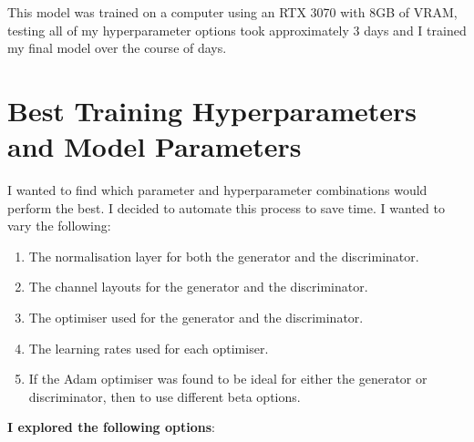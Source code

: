 \documentclass{UoYCSproject}
\begin{document}


This model was trained on a computer using an RTX 3070 with 8GB of VRAM, testing all of my hyperparameter options took approximately 3 days and I trained my final model over the course of 
days.

\section{Best Training Hyperparameters and Model Parameters}

I wanted to find which parameter and hyperparameter combinations would perform the best. I decided to automate this process to save time. I wanted to vary the following:
\begin{enumerate}
\item The normalisation layer for both the generator and the discriminator.
\item The channel layouts for the generator and the discriminator.
\item The optimiser used for the generator and the discriminator.
\item The learning rates used for each optimiser.
\item If the Adam optimiser was found to be ideal for either the generator or discriminator, then to use different beta options.
\end{enumerate}

\textbf{I explored the following options}:
\end{document}
